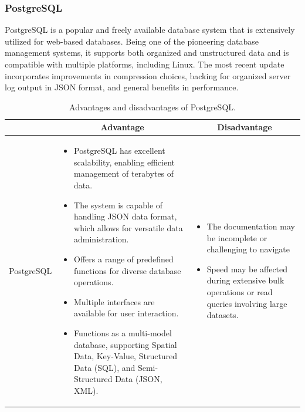 \subsubsection{PostgreSQL}

PostgreSQL is a popular and freely available database system that is extensively utilized for web-based databases. Being one of the pioneering database management systems, it supports both organized and unstructured data and is compatible with multiple platforms, including Linux. The most recent update incorporates improvements in compression choices, backing for organized server log output in JSON format, and general benefits in performance.

\begin{table}[H]
    \centering
    \begin{tabular}{| c | p{} | p{} |}
        \hline
        \multicolumn{1}{|c|}{}
        & \multicolumn{1}{c|}{Advantage}
        & \multicolumn{1}{c|}{Disadvantage} \\ \hline
        \multirow{10}{*}{PostgreSQL}     
                &   \begin{itemize}[leftmargin=*,topsep=0pt,partopsep=0pt,parsep=0pt]
                        \item PostgreSQL has excellent scalability, enabling efficient management of terabytes of data.
                        \item The system is capable of handling JSON data format, which allows for versatile data administration.
                        \item Offers a range of predefined functions for diverse database operations.
                        \item Multiple interfaces are available for user interaction.
                        \item Functions as a multi-model database, supporting Spatial Data, Key-Value, Structured Data (SQL), and Semi-Structured Data (JSON, XML).
                    \end{itemize}
                &   \begin{itemize}[leftmargin=*,topsep=0pt,partopsep=0pt,parsep=0pt]
                        \item The documentation may be incomplete or challenging to navigate
                        \item Speed may be affected during extensive bulk operations or read queries involving large datasets.
                    \end{itemize} \\ \hline
    \end{tabular}
    \caption{Advantages and disadvantages of PostgreSQL.}
\end{table}

